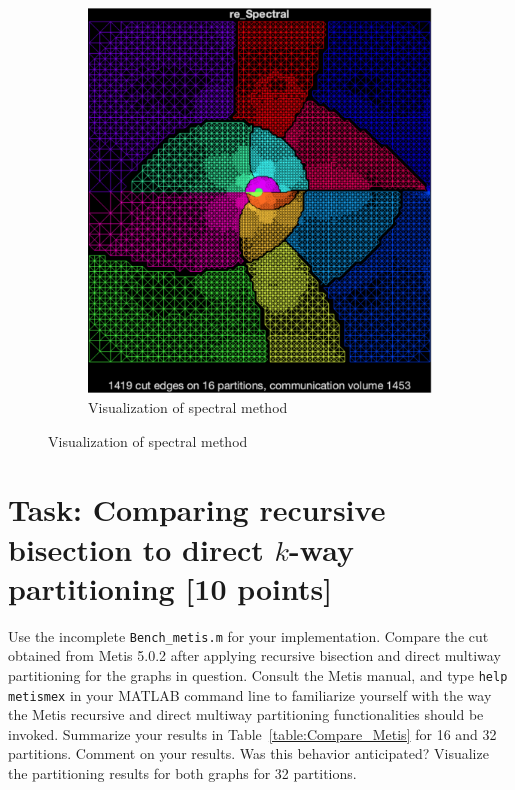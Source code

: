 \documentclass[unicode,11pt,a4paper,oneside,numbers=endperiod,openany]{scrartcl}
\begin{document}
\begin{figure}[htbp]
\begin{subfigure}[b]{0.3\textwidth}
        \includegraphics[width=\textwidth]{images/spectral.png}
        \caption{Visualization of spectral method} 
    \end{subfigure}
    
\end{figure}


\section{Task: Comparing recursive bisection to direct $k$-way partitioning [10 points]}

Use the incomplete \texttt{Bench\_metis.m} for your implementation. Compare the cut obtained from Metis 5.0.2 after applying recursive bisection and direct multiway partitioning for the graphs in question. Consult the Metis manual, and type \texttt{help metismex} in your MATLAB command line to familiarize yourself with the way the Metis recursive and direct multiway partitioning functionalities should be invoked. Summarize your results in Table~\ref{table:Compare_Metis} for 16 and 32 partitions. Comment on your results. Was this behavior anticipated? Visualize the partitioning results for both graphs for 32 partitions.
\end{document}
